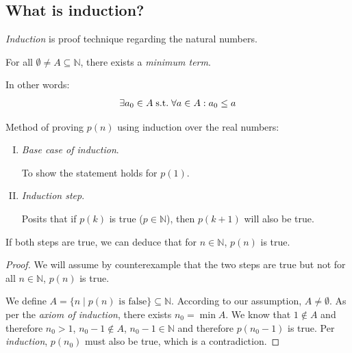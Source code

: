 \documentclass[00_complete]{subfiles}
\begin{document}
\subsection{What is induction?}
\emph{Induction} is proof technique regarding the natural numbers.

\begin{axiom}
    For all $\emptyset \neq A \subseteq \mathbb{N}$, there exists a \emph{minimum
    term}.

    In other words:
    $$\exists a_0 \in A \;\mathrm{s.t.}\; \forall a \in A: a_0 \leq a$$
\end{axiom}

Method of proving $p(n)$ using induction over the real numbers:
\begin{enumerate}[I.]
    \item \emph{Base case of induction}.

    To show the statement holds for $p(1)$.
    \item \emph{Induction step}.

    Posits that if $p(k)$ is true ($p \in \mathbb{N}$), then $p(k+1)$ will also
    be true.
\end{enumerate}
If both steps are true, we can deduce that for $n \in \mathbb{N}$, $p(n)$ is true.
\begin{proof}
    We will assume by counterexample that the two steps are true but not for
    all $n \in \mathbb{N}$, $p(n)$ is true.

    We define $A =\{n \mid p(n) \text{ is false}\} \subseteq \mathbb{N}$.
    According to our assumption, $A \neq \emptyset$. As per the \emph{axiom of
    induction}, there exists $n_0 = \min{A}$. We know that $1 \notin A$ and
    therefore $n_0>1$, $n_0-1 \notin A$, $n_0-1 \in \mathbb{N}$ and therefore
    $p(n_0-1)$ is true. Per \emph{induction}, $p(n_0)$ must also be true, which
    is a contradiction.
\end{proof}
\end{document}
